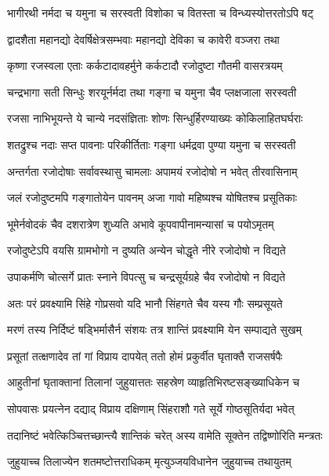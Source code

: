 \twolineshloka
{भागीरथी नर्मदा च यमुना च सरस्वती}
{विशोका च वितस्ता च विन्ध्यस्योत्तरतोऽपि षट्} %

\twolineshloka
{द्वादशैता महानद्यो देवर्षिक्षेत्रसम्भवाः}
{महानद्यो देविका च कावेरी वञ्जरा तथा} %

\twolineshloka
{कृष्णा रजस्वला एताः कर्कटादावहर्मुने}
{कर्कटादौ रजोदुष्टा गौतमी वासरत्रयम्} %

\twolineshloka
{चन्द्रभागा सती सिन्धुः शरयूर्नर्मदा तथा}
{गङ्गा च यमुना चैव प्लक्षजाला सरस्वती} %

\twolineshloka
{रजसा नाभिभूयन्ते ये चान्ये नदसंज्ञिताः}
{शोणः सिन्धुर्हिरण्याख्यः कोकिलाहितघर्घराः} %

\twolineshloka
{शतद्रुश्च नदाः सप्त पावनाः परिकीर्तिताः}
{गङ्गा धर्मद्रवा पुण्या यमुना च सरस्वती} %

\twolineshloka
{अन्तर्गता रजोदोषाः सर्वावस्थासु चामलाः}
{अपामयं रजोदोषो न भवेत् तीरवासिनाम्} %

\twolineshloka
{जलं रजोदुष्टमपि गङ्गातोयेन पावनम्}
{अजा गावो महिष्यश्च योषितश्च प्रसूतिकाः} %

\twolineshloka
{भूमेर्नवोदकं चैव दशरात्रेण शुध्यति}
{अभावे कूपवापीनामन्यासां च पयोऽमृतम्} %

\twolineshloka
{रजोदुष्टेऽपि वयसि ग्रामभोगो न दुष्यति}
{अन्येन चोद्धृते नीरे रजोदोषो न विद्यते} %

\twolineshloka
{उपाकर्मणि चोत्सर्गे प्रातः स्नाने विपत्सु च}
{चन्द्रसूर्यग्रहे चैव रजोदोषो न विद्यते} %

\twolineshloka
{अतः परं प्रवक्ष्यामि सिंहे गोप्रसवो यदि}
{भानौ सिंहगते चैव यस्य गौः सम्प्रसूयते} %

\twolineshloka
{मरणं तस्य निर्दिष्टं षड्भिर्मासैर्न संशयः}
{तत्र शान्तिं प्रवक्ष्यामि येन सम्पाद्यते सुखम्} %

\twolineshloka
{प्रसूतां तत्क्षणादेव तां गां विप्राय दापयेत्}
{ततो होमं प्रकुर्वीत घृताक्तै राजसर्षपैः} %

\twolineshloka
{आहुतीनां घृताक्तानां तिलानां जुहुयात्ततः}
{सहस्रेण व्याहृतिभिरष्टसङ्ख्याधिकेन च} %

\twolineshloka
{सोपवासः प्रयत्नेन दद्याद् विप्राय दक्षिणाम्}
{सिंहराशौ गते सूर्ये गोष्ठसूतिर्यदा भवेत्} %

\twolineshloka
{तदानिष्टं भवेत्किञ्चित्तच्छान्त्यै शान्तिकं चरेत्}
{अस्य वामेति सूक्तेन तद्विष्णोरिति मन्त्रतः} %

\twolineshloka
{जुहुयाच्च तिलाज्येन शतमष्टोत्तराधिकम्}
{मृत्युञ्जयविधानेन जुहुयाच्च तथायुतम्} %

